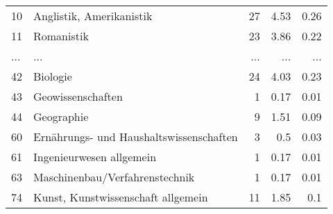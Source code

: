 \begin{longtable}{lXrrr}
        10 & \multicolumn{1}{X}{Anglistik, Amerikanistik} & %
          \num{27} &
          \num[round-mode=places,round-precision=2]{4.53} &
          \num[round-mode=places,round-precision=2]{0.26} \\
        11 & \multicolumn{1}{X}{Romanistik} & %
          \num{23} &
          \num[round-mode=places,round-precision=2]{3.86} &
          \num[round-mode=places,round-precision=2]{0.22} \\
       ... & ... & ... & ... & ... \\
        42 & \multicolumn{1}{X}{Biologie} & %
          \num{24} &
          \num[round-mode=places,round-precision=2]{4.03} &
          \num[round-mode=places,round-precision=2]{0.23} \\

        43 & \multicolumn{1}{X}{Geowissenschaften} & %
          \num{1} &
          \num[round-mode=places,round-precision=2]{0.17} &
          \num[round-mode=places,round-precision=2]{0.01} \\

        44 & \multicolumn{1}{X}{Geographie} & %
          \num{9} &
          \num[round-mode=places,round-precision=2]{1.51} &
          \num[round-mode=places,round-precision=2]{0.09} \\

        60 & \multicolumn{1}{X}{Ernährungs- und Haushaltswissenschaften} & %
          \num{3} &
          \num[round-mode=places,round-precision=2]{0.5} &
          \num[round-mode=places,round-precision=2]{0.03} \\

        61 & \multicolumn{1}{X}{Ingenieurwesen allgemein} & %
          \num{1} &
          \num[round-mode=places,round-precision=2]{0.17} &
          \num[round-mode=places,round-precision=2]{0.01} \\

        63 & \multicolumn{1}{X}{Maschinenbau/Verfahrenstechnik} & %
          \num{1} &
          \num[round-mode=places,round-precision=2]{0.17} &
          \num[round-mode=places,round-precision=2]{0.01} \\

        74 & \multicolumn{1}{X}{Kunst, Kunstwissenschaft allgemein} & %
          \num{11} &
          \num[round-mode=places,round-precision=2]{1.85} &
          \num[round-mode=places,round-precision=2]{0.1} \\


\end{longtable}
